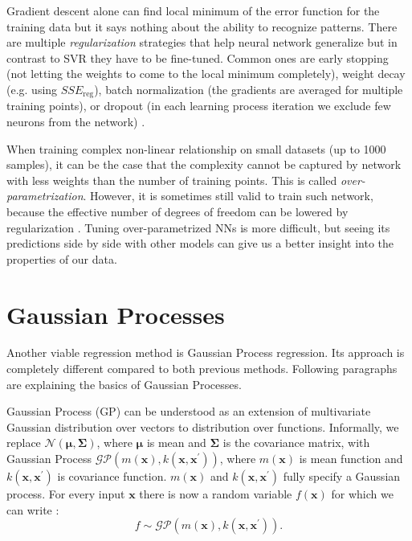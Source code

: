 Gradient descent alone can find local minimum of the error function for the training data but it says nothing about the ability to recognize patterns. There are multiple \textit{regularization} strategies that help neural network generalize but in contrast to SVR they have to be fine-tuned. Common ones are early stopping (not letting the weights to come to the local minimum completely), weight decay (e.g. using $SSE_{\mathrm{reg}}$), batch normalization (the gradients are averaged for multiple training points), or dropout (in each learning process iteration we exclude few neurons from the network) \cite{bishop2006,srivastava2014}.

When training complex non-linear relationship on small datasets (up to 1000 samples), it can be the case that the complexity cannot be captured by network with less weights than the number of training points. This is called \textit{over-parametrization}. However, it is sometimes still valid to train such network, because the effective number of degrees of freedom can be lowered by regularization \cite{barlett1998,ingrassia2005}. Tuning over-parametrized NNs is more difficult, but seeing its predictions side by side with other models can give us a better insight into the properties of our data.

\section{Gaussian Processes}
\label{sec:gp-theory}
Another viable regression method is Gaussian Process regression. Its approach is completely different compared to both previous methods. Following paragraphs are explaining the basics of Gaussian Processes.

Gaussian Process (GP) can be understood as an extension of multivariate Gaussian distribution over vectors to distribution over functions. Informally, we replace $\mathcal{N}(\bm{\mu},\bm{\Sigma})$, where $\bm{\mu}$ is mean and $\bm{\Sigma}$ is the covariance matrix, with Gaussian Process $\mathcal{GP}(m(\bm{x}),k(\bm{x},\bm{x}^\prime))$, where $m(\bm{x})$ is mean function and $k(\bm{x},\bm{x}^\prime)$ is covariance function. $m(\bm{x})$  and $k(\bm{x},\bm{x}^\prime)$ fully specify a Gaussian process. For every input $\bm{x}$ there is now a random variable $f(\bm{x})$ for which we can write \cite{rasmussen2004}:
\begin{equation}
	\label{eq:gp}
	f\sim\mathcal{GP}(m(\bm{x}),k(\bm{x},\bm{x}^\prime)).
\end{equation}

